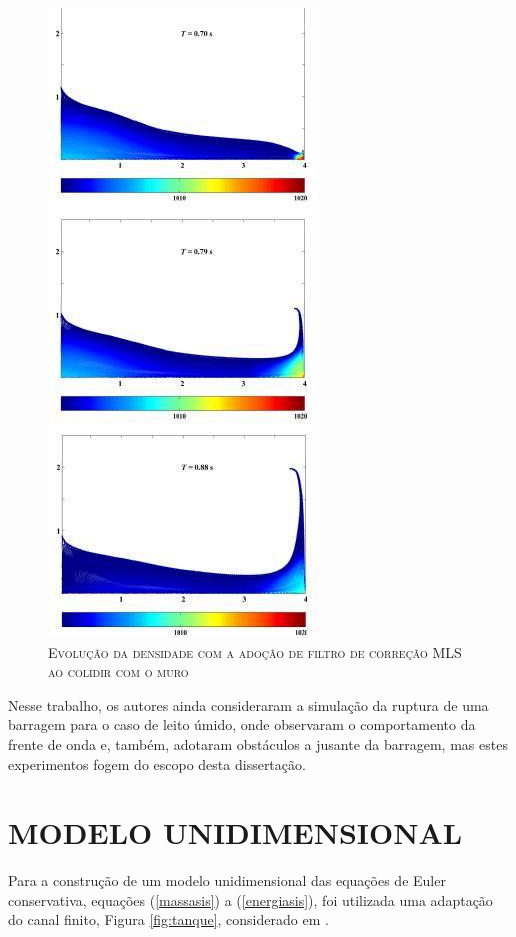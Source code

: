 \begin{figure}[H]
\centering
\includegraphics[scale=1]{figuras/cfiltroM.jpg}
\caption{\textsc{Evolução da densidade com a adoção de filtro de correção MLS ao colidir com o muro}}
\vspace{-0.1cm}
\label{fig:cfiltroM}
\end{figure}

Nesse trabalho, os autores ainda consideraram a simulação da ruptura de uma barragem para o caso de leito úmido, onde observaram o comportamento da frente de onda e, também, adotaram obstáculos a jusante da barragem, mas estes experimentos fogem do escopo desta dissertação.        
\section{MODELO UNIDIMENSIONAL} \label{Modelo1D}

Para a construção de um modelo unidimensional das equações de Euler conservativa, equações (\ref{massasis}) a (\ref{energiasis}),  foi utilizada uma adaptação do canal finito, Figura \ref{fig:tanque}, considerado em .  

